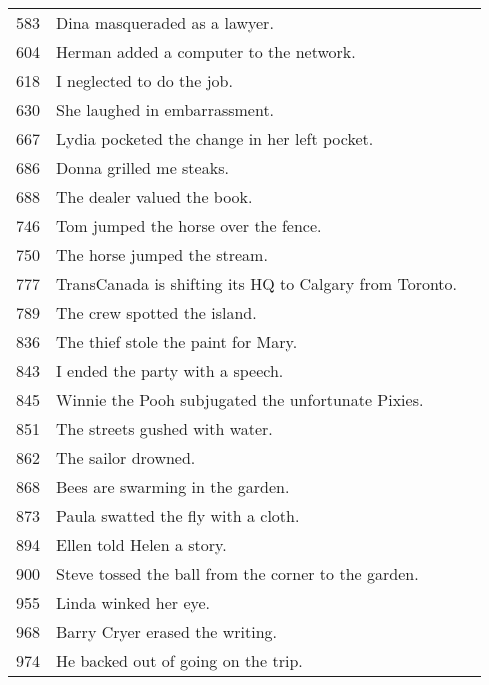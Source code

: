 \begin{table}
\begin{tabular}{llr}
583	&	Dina masqueraded as a lawyer.	\\
604	&	Herman added a computer to the network.	\\
618	&	I neglected to do the job.	\\
630	&	She laughed in embarrassment.	\\
667	&	Lydia pocketed the change in her left pocket.	\\
686	&	Donna grilled me steaks.	\\
688	&	The dealer valued the book.	\\
746	&	Tom jumped the horse over the fence.	\\
750	&	The horse jumped the stream.	\\
777	&	TransCanada is shifting its HQ to Calgary from Toronto.	\\
789	&	The crew spotted the island.	\\
836	&	The thief stole the paint for Mary.	\\
843	&	I ended the party with a speech.	\\
845	&	Winnie the Pooh subjugated the unfortunate Pixies.	\\
851	&	The streets gushed with water.	\\
862	&	The sailor drowned.	\\
868	&	Bees are swarming in the garden.	\\
873	&	Paula swatted the fly with a cloth.	\\
894	&	Ellen told Helen a story.	\\
900	&	Steve tossed the ball from the corner to the garden.	\\
955	&	Linda winked her eye.	\\
968	&	Barry Cryer erased the writing.	\\
974	&	He backed out of going on the trip.	\\
 \midrule
\end{tabular}
\end{table}